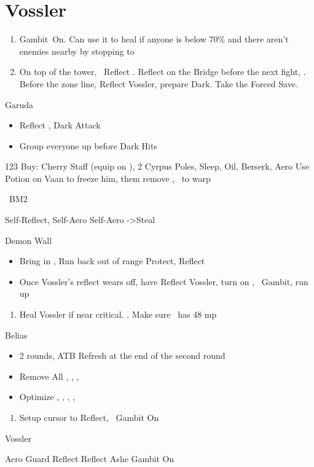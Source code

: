 \chapter{Vossler}

\begin{enumerate}
\item Gambit\ashe\ On. Can use it to heal if anyone is below 70\% and there aren't enemies nearby by stopping to \flee
\item On top of the tower, \vaan\ Reflect \vaan. Reflect on the Bridge before the next fight, \leader{\penelo}. Before the zone line, Reflect Vossler, prepare Dark. Take the Forced Save.
\end{enumerate}
\begin{battle}{Garuda}
\begin{itemize}
\item Reflect \penelo, \ashe
\penelof Dark \ashe
\ashef Attack \penelo
\item Group everyone up before Dark Hits
\end{itemize}
\end{battle}
\begin{shop}{123}
Buy: Cherry Staff (equip on \penelo), 2 Cyrpus Poles, Sleep, Oil, Berserk, Aero
Use Potion on Vaan to freeze him, them remove \ashe, \penelo\ to warp
\end{shop}
\begin{liscense}
\ashe\ BM2
\end{liscense}
\begin{gambit}
\begin{itemize}
\penelof Self-Reflect, Self-Aero
\ashef Self-Aero
->Steal
\end{itemize}
\end{gambit}
\begin{battle}{Demon Wall}
\begin{itemize}
\item Bring in \ashe, \penelo
\vaanf Run back out of range
\vaanf Protect, Reflect \vaan
\item Once Vossler's reflect wears off, have \vaan Reflect Vossler, turn on \ashe, \penelo\ Gambit, run up
\end{itemize}
\end{battle}
\begin{enumerate}
\item Heal Vossler if near critical. . Make sure \penelo\ has 48 mp
\end{enumerate}
\begin{battle}{Belias}
\begin{itemize}
\vaanf Reflect Vossler, then pick up chest
\vaanf Reflect \vaan
\item 2 rounds, ATB Refresh at the end of the second round
\item Remove All \vaan, \penelo, \ashe, \basch
\item Optimize \basch, \balthier, \vaan, \ashe, \penelo
\end{itemize}
\end{battle}
\begin{enumerate}
\item Setup cursor to Reflect, \penelo\ Gambit On
\end{enumerate}
\begin{battle}{Vossler}
\begin{itemize}
\ashef Aero Guard
\vaanf Reflect \vaan
\penelof Reflect Ashe
\ashef Gambit On
\end{itemize}
\end{battle}